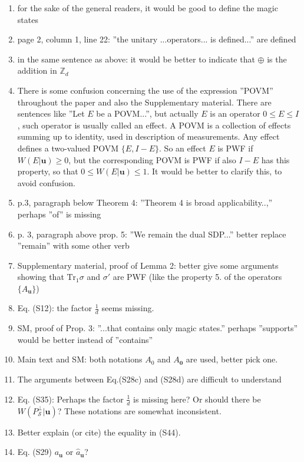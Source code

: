 \documentclass[12pt]{article}
\begin{document}
\begin{enumerate}
\item for the sake of the general readers, it would be good to define the magic states
\item page 2, column 1, line 22: ''the unitary ...operators... is defined...''  are
defined
\item in the same sentence as above: it would be better to indicate that $\oplus$ is the
addition in $\mathbb Z_d$
\item There is some confusion concerning the use of the expression ''POVM'' throughout
the paper and also the Supplementary material. There are sentences like ''Let $E$ be a
POVM...'', but actually $E$ is an operator $0\le E\le I$, such operator is usually called an
effect. A POVM is a collection of effects summing up to identity, used in description of
measurements.  Any effect defines a 
two-valued POVM $\{E, I-E\}$. So an effect $E$ is PWF if $W(E|\mathbf{u})\ge 0$, but the
corresponding POVM is PWF if also $I-E$ has this property, so that $0\le W(E|\mathbf{u})\le
1$. It would be better to clarify this, to avoid confusion.

\item p.3, paragraph below Theorem 4: ''Theorem 4 is broad applicability..,'' perhaps
''of'' is missing

\item p. 3, paragraph above prop. 5: ''We remain the dual SDP...'' better replace
''remain'' with some other verb 

\item Supplementary material, proof of Lemma 2: better give some arguments showing that
$\mathrm{Tr}_1 \sigma$ and $\sigma'$ are PWF (like the property 5. of the operators
$\{A_{\mathbf{u}}\}$)

\item Eq. (S12): the factor $\frac1d$ seems missing.
\item SM, proof of Prop. 3: ''...that contains only magic states.'' perhaps ''supports''
would be better instead of ''contains''
\item Main text and SM: both  notations $A_0$ and $A_{\textbf{0}}$  are used, better pick
one.
\item The arguments between Eq.(S28c) and (S28d) are  difficult to understand
\item  Eq. (S35): Perhaps the factor $\frac1d$ is missing here? Or should there be
$W(P_{\mathcal S}^\perp|\mathbf{u})$? These notations are somewhat inconsistent.

\item Better explain (or cite) the equality in (S44).
\item Eq. (S29) $a_{\mathbf{u}}$ or $\hat a_{\mathbf{u}}$? 
\end{enumerate}





\
\end{document}
